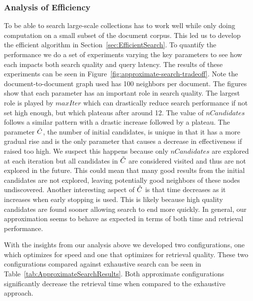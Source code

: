 \documentclass[sigconf,]{acmart}
\begin{document}
\subsubsection{Analysis of Efficiency} \label{sec:AnalysisOfEfficiency}
To be able to search large-scale collections \name{} has to work well while only doing computation on a small subset of the document corpus. This led us to develop the efficient algorithm in Section~\ref{sec:EfficientSearch}. To quantify the performance we do a set of experiments varying the key parameters to see how each impacts both search quality and query latency. The results of these experiments can be seen in Figure~\ref{fig:approximate-search-tradeoff}. Note the document-to-document graph used has 100 neighbors per document. The figures show that each parameter has an important role in search quality. The largest role is played by $maxIter$ which can drastically reduce search performance if not set high enough, but which plateaus after around 12. The value of $nCandidates$ follows a similar pattern with a drastic increase followed by a plateau. The parameter $\Tilde{C}$, the number of initial candidates, is unique in that it has a more gradual rise and is the only parameter that causes a decrease in effectiveness if raised too high. We suspect this happens because only $nCandidates$ are explored at each iteration but all candidates in $\Tilde{C}$ are considered visited and thus are not explored in the future. This could mean that many good results from the initial candidates are not explored, leaving potentially good neighbors of these nodes undiscovered. Another interesting aspect of $\Tilde{C}$ is that time decreases as it increases when early stopping is used. This is likely because high quality candidates are found sooner allowing search to end more quickly. In general, our approximation seems to behave as expected in terms of both time and retrieval performance.

With the insights from our analysis above we developed two configurations, one which optimizes for speed and one that optimizes for retrieval quality. These two configurations compared against exhaustive search can be seen in Table~\ref{tab:ApproximateSearchResults}. Both approximate configurations significantly decrease the retrieval time when compared to the exhaustive approach.
\end{document}
